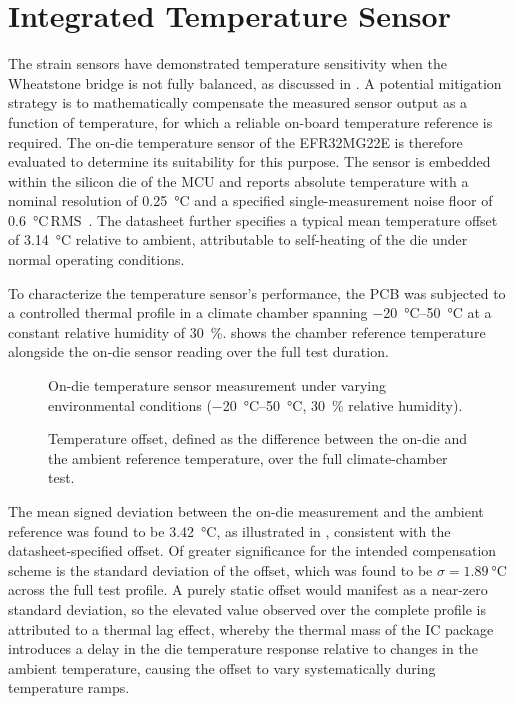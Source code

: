 \section{Integrated Temperature Sensor} \label{sec:temp_sensor}

The strain sensors have demonstrated temperature sensitivity when the Wheatstone bridge is not fully balanced, as discussed in . A potential mitigation strategy is to mathematically compensate the measured sensor output as a function of temperature, for which a reliable on-board temperature reference is required. The on-die temperature sensor of the EFR32MG22E is therefore evaluated to determine its suitability for this purpose. The sensor is embedded within the silicon die of the MCU and reports absolute temperature with a nominal resolution of \SI{0.25}{\celsius} and a
specified single-measurement noise floor of \SI{0.6}{\celsius}\,RMS~\cite{EFR32MG22E}.
The datasheet further specifies a typical mean temperature offset of \SI{3.14}{\celsius}
relative to ambient, attributable to self-heating of the die under normal operating
conditions.

To characterize the temperature sensor's performance, the PCB was subjected to a controlled thermal profile in a climate chamber spanning \SIrange{-20}{50}{\celsius} at a constant relative humidity of \SI{30}{\percent}.
 shows the chamber reference temperature alongside the on-die sensor reading over the full test duration.

\begin{figure}
    \centering
    
    \caption{On-die temperature sensor measurement under varying environmental conditions
             (\SIrange{-20}{50}{\celsius}, \SI{30}{\percent} relative humidity).}
    \label{fig:FS_temp}
\end{figure}

\begin{figure}
    \centering
    
    \caption{Temperature offset, defined as the difference between the on-die and the ambient reference temperature, over the full climate-chamber test.}
    \label{fig:temp_diff}
\end{figure}

The mean signed deviation between the on-die measurement and the ambient reference was found to be \SI{+3.42}{\celsius}, as illustrated in , consistent with the datasheet-specified offset.
Of greater significance for the intended compensation scheme is the standard deviation of the offset, which was found to be $\sigma = \SI{1.89}{\celsius}$ across the full test profile.
A purely static offset would manifest as a near-zero standard deviation, so the elevated value observed over the complete profile is attributed to a thermal lag effect, whereby the thermal mass of the IC package introduces a delay in the die temperature response relative to changes in the ambient temperature, causing the offset to vary systematically during temperature ramps.

